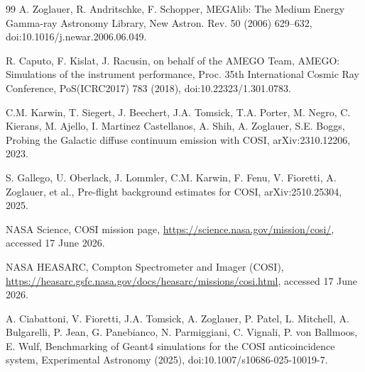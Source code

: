 \documentclass[preprint,12pt]{elsarticle}
\begin{document}
\begin{thebibliography}{99}
A. Zoglauer, R. Andritschke, F. Schopper, MEGAlib: The Medium Energy Gamma-ray Astronomy Library, New Astron. Rev. 50 (2006) 629--632, doi:10.1016/j.newar.2006.06.049.

R. Caputo, F. Kislat, J. Racusin, on behalf of the AMEGO Team, AMEGO: Simulations of the instrument performance, Proc. 35th International Cosmic Ray Conference, PoS(ICRC2017) 783 (2018), doi:10.22323/1.301.0783.

C.M. Karwin, T. Siegert, J. Beechert, J.A. Tomsick, T.A. Porter, M. Negro, C. Kierans, M. Ajello, I. Martinez Castellanos, A. Shih, A. Zoglauer, S.E. Boggs, Probing the Galactic diffuse continuum emission with COSI, arXiv:2310.12206, 2023.

S. Gallego, U. Oberlack, J. Lommler, C.M. Karwin, F. Fenu, V. Fioretti, A. Zoglauer, et al., Pre-flight background estimates for COSI, arXiv:2510.25304, 2025.

NASA Science, COSI mission page, \url{https://science.nasa.gov/mission/cosi/}, accessed 17 June 2026.

NASA HEASARC, Compton Spectrometer and Imager (COSI), \url{https://heasarc.gsfc.nasa.gov/docs/heasarc/missions/cosi.html}, accessed 17 June 2026.

A. Ciabattoni, V. Fioretti, J.A. Tomsick, A. Zoglauer, P. Patel, L. Mitchell, A. Bulgarelli, P. Jean, G. Panebianco, N. Parmiggiani, C. Vignali, P. von Ballmoos, E. Wulf, Benchmarking of Geant4 simulations for the COSI anticoincidence system, Experimental Astronomy (2025), doi:10.1007/s10686-025-10019-7.

\end{thebibliography}
\end{document}
